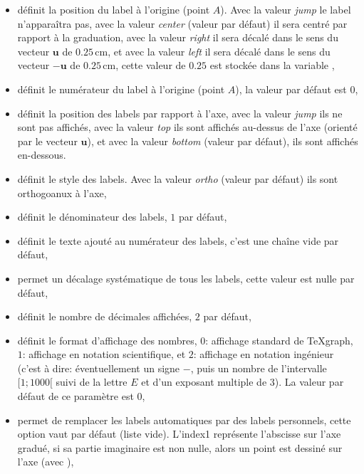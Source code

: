\begin{itemize}
\begin{itemize}
  \item {} définit la position du label à l'origine (point $A$). Avec la valeur \emph{jump} le label n'apparaîtra pas, avec la valeur \emph{center} (valeur par défaut) il sera centré par rapport à la graduation, avec la valeur \emph{right} il sera décalé dans le sens du vecteur $\mathbf{u}$ de $0.25$\,cm, et avec la valeur \emph{left} il sera décalé dans le sens du vecteur $-\mathbf{u}$ de $0.25$\,cm, cette valeur de $0.25$ est stockée dans la variable ,
  \item {} définit le numérateur du label à l'origine (point $A$), la valeur par défaut est $0$,
  \item {} définit la position des labels par rapport à l'axe, avec la valeur \emph{jump} ils ne sont pas affichés, avec la valeur \emph{top} ils sont affichés au-dessus de l'axe (orienté par le vecteur $\mathbf{u}$), et avec la valeur \emph{bottom} (valeur par défaut), ils sont affichés en-dessous.
  \item {} définit le style des labels. Avec la valeur \emph{ortho} (valeur par défaut) ils sont orthogoanux à l'axe,
  \item {} définit le dénominateur des labels, $1$ par défaut,
  \item {} définit le texte ajouté au numérateur des labels, c'est une chaîne vide par défaut,
  \item {} permet un décalage systématique de tous les labels, cette valeur est nulle par défaut,
  \item {} définit le nombre de décimales affichées, $2$ par défaut,
  \item {} définit le format d'affichage des nombres, $0$: affichage standard de TeXgraph, $1$: affichage en notation scientifique, et $2$: affichage en notation ingénieur (c'est à dire: éventuellement un signe $-$, puis un nombre de l'intervalle $[1; 1000[$ suivi de la lettre $E$ et d'un exposant multiple de $3$). La valeur par défaut de ce paramètre est $0$,
  \item {} permet de remplacer les labels automatiques par des labels personnels, cette option vaut \Nil par défaut (liste vide). L'index1 représente l'abscisse sur l'axe gradué, si sa partie imaginaire est non nulle, alors un point est dessiné sur l'axe (avec ),

\end{itemize}
\end{itemize}

